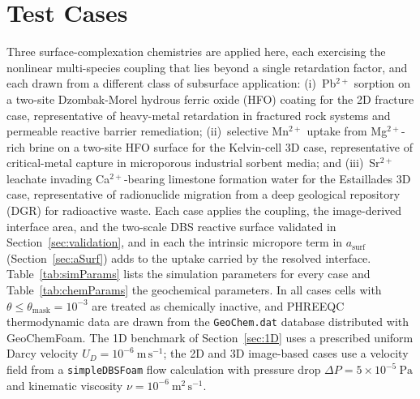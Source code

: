 \section{Test Cases}

Three surface-complexation chemistries are applied here, each exercising the
nonlinear multi-species coupling that lies beyond a single retardation factor,
and each drawn from a different class of subsurface application:
(i)~Pb$^{2+}$ sorption on a two-site Dzombak-Morel hydrous ferric oxide (HFO)
coating for the 2D fracture case, representative of heavy-metal retardation in
fractured rock systems and permeable reactive barrier remediation;
(ii)~selective Mn$^{2+}$ uptake from Mg$^{2+}$-rich brine on a two-site HFO
surface for the Kelvin-cell 3D case, representative of critical-metal capture
in microporous industrial sorbent media; and
(iii)~Sr$^{2+}$ leachate invading Ca$^{2+}$-bearing limestone formation water
for the Estaillades 3D case, representative of radionuclide migration from a
deep geological repository (DGR) for radioactive waste.
Each case applies the coupling, the image-derived interface area, and the
two-scale DBS reactive surface validated in Section~\ref{sec:validation}, and
in each the intrinsic micropore term in $a_{\mathrm{surf}}$
(Section~\ref{sec:aSurf}) adds to the uptake carried by the resolved interface.
Table~\ref{tab:simParams} lists the simulation parameters for every case and
Table~\ref{tab:chemParams} the geochemical parameters.
In all cases cells with $\theta \le \theta_{\mathrm{mask}} = 10^{-3}$ are
treated as chemically inactive, and PHREEQC thermodynamic data are drawn from
the \texttt{GeoChem.dat} database distributed with GeoChemFoam.
The 1D benchmark of Section~\ref{sec:1D} uses a prescribed uniform Darcy
velocity $U_D = 10^{-6}\ \mathrm{m\,s^{-1}}$; the 2D and 3D image-based cases
use a velocity field from a \texttt{simpleDBSFoam} flow calculation with
pressure drop
$\Delta P = 5\times10^{-5}\ \mathrm{Pa}$ and kinematic viscosity
$\nu = 10^{-6}\ \mathrm{m^{2}\,s^{-1}}$.

